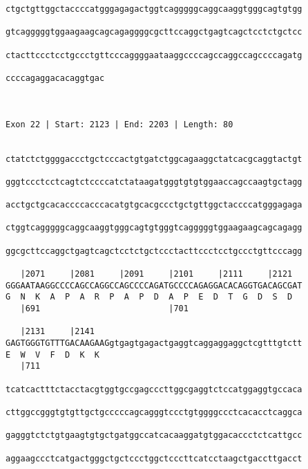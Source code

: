 \documentclass{article}
\begin{document}
\begin{Verbatim}
ctgctgttggctaccccatgggagagactggtcagggggcaggcaaggtgggcagtgtgg
                                                            
gtcagggggtggaagaagcagcagaggggcgcttccaggctgagtcagctcctctgctcc
                                                            
ctacttccctcctgccctgttcccaggggaataaggccccagccaggccagccccagatg
                                                            
ccccagaggacacaggtgac
                    
                    
 
Exon 22 | Start: 2123 | End: 2203 | Length: 80


ctatctctggggaccctgctcccactgtgatctggcagaaggctatcacgcaggtactgt
                                                            
gggtccctcctcagtctccccatctataagatgggtgtgtggaaccagccaagtgctagg
                                                            
acctgctgcacaccccacccacatgtgcacgccctgctgttggctaccccatgggagaga
                                                            
ctggtcagggggcaggcaaggtgggcagtgtgggtcagggggtggaagaagcagcagagg
                                                            
ggcgcttccaggctgagtcagctcctctgctccctacttccctcctgccctgttcccagg
                                                            
   |2071     |2081     |2091     |2101     |2111     |2121  
GGGAATAAGGCCCCAGCCAGGCCAGCCCCAGATGCCCCAGAGGACACAGGTGACAGCGAT
G  N  K  A  P  A  R  P  A  P  D  A  P  E  D  T  G  D  S  D  
   |691                          |701                       
  
   |2131     |2141                                          
GAGTGGGTGTTTGACAAGAAGgtgagtgagactgaggtcaggaggaggctcgtttgtctt
E  W  V  F  D  K  K                                         
   |711                                                     
  
tcatcactttctacctacgtggtgccgagcccttggcgaggtctccatggaggtgccaca
                                                            
cttggccgggtgtgttgctgcccccagcagggtccctgtggggccctcacacctcaggca
                                                            
gagggtctctgtgaagtgtgctgatggccatcacaaggatgtggacaccctctcattgcc
                                                            
aggaagccctcatgactgggctgctccctggctcccttcatcctaagctgaccttgacct
                                                            

\end{Verbatim}
\end{document}
